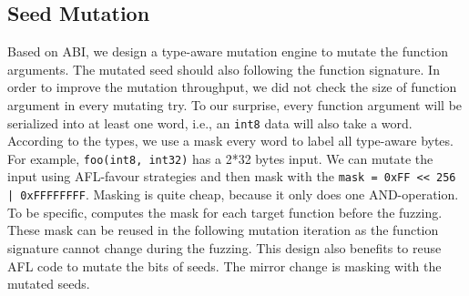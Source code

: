\subsection{Seed Mutation}
Based on ABI, we design a type-aware mutation engine to mutate the function arguments. 
The mutated seed should also following the function signature.
%
In order to improve the mutation throughput, we did not check the size of function argument in every mutating try. 
To our surprise, every function argument will be serialized into at least one word, i.e., an \texttt{int8} data will also take a word.
According to the types, we use a mask every word to label all type-aware bytes.
For example, \texttt{foo(int8, int32)} has a 2*32 bytes input. We can mutate the input using AFL-favour strategies and then mask with the \texttt{mask = 0xFF << 256 | 0xFFFFFFFF}. Masking is quite cheap, because it only does one AND-operation.
To be specific, {\tool} computes the mask for each target function before the fuzzing. These mask can be reused in the following mutation iteration as the function signature cannot change during the fuzzing. 
This design also benefits {\tool} to reuse AFL code to mutate the bits of seeds. The mirror change is masking with the mutated seeds.
